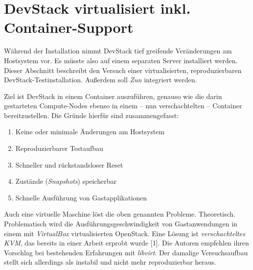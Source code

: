 \section{DevStack virtualisiert inkl. Container-Support}

Während der Installation nimmt DevStack tief greifende Veränderungen am Hostsystem vor. Es müsste also auf einem separaten Server installiert werden. Dieser Abschnitt beschreibt den Versuch einer virtualisierten, reproduzierbaren DevStack-Testinstallation. Außerdem soll \emph{Zun} integriert werden. 

Ziel ist DevStack in einem Container auszuführen, genauso wie die darin gestarteten Compute-Nodes ebenso in einem -- nun verschachtelten -- Container bereitzustellen. Die Gründe hierfür sind zusammengefasst:

\begin{enumerate}
	\item Keine oder minimale Änderungen am Hostsystem
	\item Reproduzierbarer Testaufbau
	\item Schneller und rückstandsloser Reset
	\item Zustände (\emph{Snapshots}) speicherbar
	\item Schnelle Ausführung von Gastapplikationen
\end{enumerate}

\noindent Auch eine virtuelle Maschine löst die oben genannten Probleme. Theoretisch. Problematisch wird die Ausführungsgeschwindigkeit von Gastanwendungen in einem mit \emph{VirtualBox} virtualisierten OpenStack. Eine Lösung ist \emph{verschachteltes KVM}, das bereits in einer Arbeit erprobt wurde [1]. Die Autoren empfehlen ihren Vorschlag bei bestehenden Erfahrungen mit \emph{libvirt}. Der damalige Versuchsaufbau stellt sich allerdings als instabil und nicht mehr reproduzierbar heraus.

